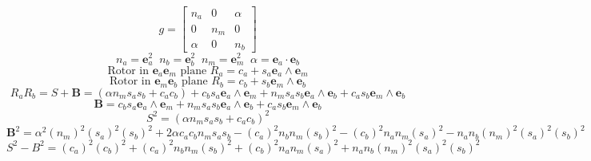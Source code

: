 \documentclass[10pt,fleqn]{report}
\newcommand{\T}[1]{\text{#1}}
\begin{document}
\T{Code Output:}
\begin{equation} g =  \left [ \begin{array}{ccc} n_{a} & 0 & \alpha   \\ 0 & n_{m} & 0  \\ \alpha  & 0 & n_{b}  \end{array}\right ]  \nonumber\end{equation}
\begin{equation} n_{a} = \bm{e}_{a}^{2}\;\;n_{b} = \bm{e}_{b}^{2}\;\;n_{m} = \bm{e}_{m}^{2}\;\;\alpha = \bm{e}_{a}\cdot\bm{e}_{b} \nonumber\end{equation}
\begin{equation} \mbox{Rotor in }\bm{e}_{a}\bm{e}_{m}\mbox{ plane } R_{a} = c_{a}  + s_{a} \boldsymbol{e}_{a}\wedge \boldsymbol{e}_{m} \nonumber\end{equation}
\begin{equation} \mbox{Rotor in }\bm{e}_{m}\bm{e}_{b}\mbox{ plane } R_{b} = c_{b}  + s_{b} \boldsymbol{e}_{m}\wedge \boldsymbol{e}_{b} \nonumber\end{equation}
\begin{equation} R_{a}R_{b} = S+\bm{B} = \left ( \alpha  n_{m} s_{a} s_{b} + c_{a} c_{b}\right )  + c_{b} s_{a} \boldsymbol{e}_{a}\wedge \boldsymbol{e}_{m} + n_{m} s_{a} s_{b} \boldsymbol{e}_{a}\wedge \boldsymbol{e}_{b} + c_{a} s_{b} \boldsymbol{e}_{m}\wedge \boldsymbol{e}_{b} \nonumber\end{equation}
\begin{equation} \bm{B} = c_{b} s_{a} \boldsymbol{e}_{a}\wedge \boldsymbol{e}_{m} + n_{m} s_{a} s_{b} \boldsymbol{e}_{a}\wedge \boldsymbol{e}_{b} + c_{a} s_{b} \boldsymbol{e}_{m}\wedge \boldsymbol{e}_{b} \nonumber\end{equation}
\begin{equation} S^{2} = \left(\alpha  n_{m} s_{a} s_{b} + c_{a} c_{b}\right)^{2} \nonumber\end{equation}
\begin{equation} \bm{B}^{2} = \alpha ^{2} {\left ( n_{m} \right )}^{2} {\left ( s_{a} \right )}^{2} {\left ( s_{b} \right )}^{2} + 2 \alpha  c_{a} c_{b} n_{m} s_{a} s_{b} - {\left ( c_{a} \right )}^{2} n_{b} n_{m} {\left ( s_{b} \right )}^{2} - {\left ( c_{b} \right )}^{2} n_{a} n_{m} {\left ( s_{a} \right )}^{2} - n_{a} n_{b} {\left ( n_{m} \right )}^{2} {\left ( s_{a} \right )}^{2} {\left ( s_{b} \right )}^{2} \nonumber\end{equation}
\begin{equation} S^{2}-B^{2} = {\left ( c_{a} \right )}^{2} {\left ( c_{b} \right )}^{2} + {\left ( c_{a} \right )}^{2} n_{b} n_{m} {\left ( s_{b} \right )}^{2} + {\left ( c_{b} \right )}^{2} n_{a} n_{m} {\left ( s_{a} \right )}^{2} + n_{a} n_{b} {\left ( n_{m} \right )}^{2} {\left ( s_{a} \right )}^{2} {\left ( s_{b} \right )}^{2} \nonumber\end{equation}
\end{document}

